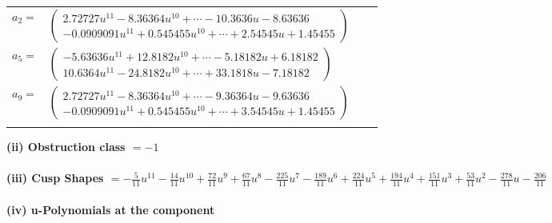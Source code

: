 \documentclass[1p]{elsarticle_modified}
\theoremstyle{definition}
\begin{document}
\begin{tabular}{m{7pt} m{180pt} m{7pt} m{180pt} }
\flushright $a_{2}=$&$\begin{pmatrix}2.72727 u^{11}-8.36364 u^{10}+\cdots-10.3636 u-8.63636\\-0.0909091 u^{11}+0.545455 u^{10}+\cdots+2.54545 u+1.45455\end{pmatrix}$ \\
\flushright $a_{5}=$&$\begin{pmatrix}-5.63636 u^{11}+12.8182 u^{10}+\cdots-5.18182 u+6.18182\\10.6364 u^{11}-24.8182 u^{10}+\cdots+33.1818 u-7.18182\end{pmatrix}$ \\
\flushright $a_{9}=$&$\begin{pmatrix}2.72727 u^{11}-8.36364 u^{10}+\cdots-9.36364 u-9.63636\\-0.0909091 u^{11}+0.545455 u^{10}+\cdots+3.54545 u+1.45455\end{pmatrix}$\\&\end{tabular}
\flushleft \textbf{(ii) Obstruction class $= -1$}\\~\\
\flushleft \textbf{(iii) Cusp Shapes $= -\frac{5}{11} u^{11}-\frac{14}{11} u^{10}+\frac{72}{11} u^9+\frac{67}{11} u^8-\frac{225}{11} u^7-\frac{189}{11} u^6+\frac{224}{11} u^5+\frac{194}{11} u^4+\frac{151}{11} u^3+\frac{53}{11} u^2-\frac{278}{11} u-\frac{206}{11}$}\\~\\
\newpage\renewcommand{\arraystretch}{1}
\flushleft \textbf{(iv) u-Polynomials at the component}\newline \\
\end{document}

